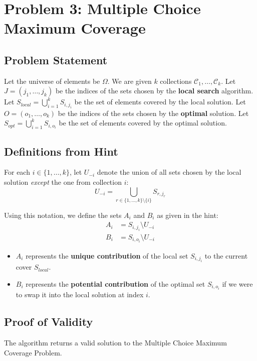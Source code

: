 \section*{Problem 3: Multiple Choice Maximum Coverage}
\subsection*{Problem Statement}
Let the universe of elements be $\Omega$. We are given $k$ collections $\mathcal{C}_1, \dots, \mathcal{C}_k$.
Let $J = (j_1, \dots, j_k)$ be the indices of the sets chosen by the \textbf{local search} algorithm.
Let $S_{local} = \bigcup_{i=1}^k S_{i, j_i}$ be the set of elements covered by the local solution.
Let $O = (o_1, \dots, o_k)$ be the indices of the sets chosen by the \textbf{optimal} solution.
Let $S_{opt} = \bigcup_{i=1}^k S_{i, o_i}$ be the set of elements covered by the optimal solution.

\subsection*{Definitions from Hint}
For each $i \in \{1, \dots, k\}$, let $U_{-i}$ denote the union of all sets chosen by the local solution \textit{except} the one from collection $i$:
\[ U_{-i} = \bigcup_{r \in \{1, \dots, k\} \setminus \{i\}} S_{r, j_r} \]

Using this notation, we define the sets $A_i$ and $B_i$ as given in the hint:
\begin{align*}
    A_i &= S_{i, j_i} \setminus U_{-i} \\
    B_i &= S_{i, o_i} \setminus U_{-i}
\end{align*}

\begin{itemize}
    \item $A_i$ represents the \textbf{unique contribution} of the local set $S_{i, j_i}$ to the current cover $S_{local}$.
    \item $B_i$ represents the \textbf{potential contribution} of the optimal set $S_{i, o_i}$ if we were to swap it into the local solution at index $i$.
\end{itemize}

\subsection*{Proof of Validity}


\begin{lemma}
The algorithm returns a valid solution to the Multiple Choice Maximum Coverage Problem.
\end{lemma}

